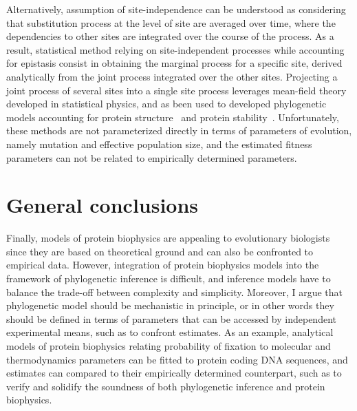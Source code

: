 Alternatively, assumption of site-independence can be understood as considering that substitution process at the level of site are averaged over time, where the dependencies to other sites are integrated over the course of the process.
As a result, statistical method relying on site-independent processes while accounting for epistasis consist in obtaining the marginal process for a specific site, derived analytically from the joint process integrated over the other sites.
Projecting a joint process of several sites into a single site process leverages mean-field theory developed in statistical physics, and as been used to developed phylogenetic models accounting for protein structure~\citep{Chi2018} and protein stability~\citep{Arenas2015a, Arenas2017}.
Unfortunately, these methods are not parameterized directly in terms of parameters of evolution, namely mutation and effective population size, and the estimated fitness parameters can not be related to empirically determined parameters.

\section{General conclusions}

Finally, models of protein biophysics are appealing to evolutionary biologists since they are based on theoretical ground and can also be confronted to empirical data.
However, integration of protein biophysics models into the framework of phylogenetic inference is difficult, and inference models have to balance the trade-off between complexity and simplicity.
Moreover, I argue that phylogenetic model should be mechanistic in principle, or in other words they should be defined in terms of parameters that can be accessed by independent experimental means, such as to confront estimates.
As an example, analytical models of protein biophysics relating probability of fixation to molecular and thermodynamics parameters can be fitted to protein coding DNA sequences, and estimates can compared to their empirically determined counterpart, such as to verify and solidify the soundness of both phylogenetic inference and protein biophysics.